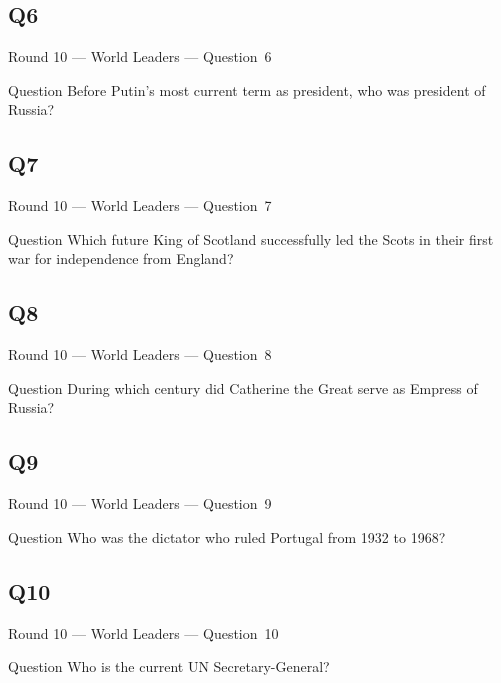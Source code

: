 \documentclass[11pt]{beamer}
\begin{document}
\subsection*{Q6}
\begin{frame}[t]{Round 10 --- World Leaders --- \mbox{Question 6}}
\vspace{-0.5em}
\begin{block}{Question}
Before Putin's most current term as president, who was president of Russia?
\end{block}
\end{frame}
\subsection*{Q7}
\begin{frame}[t]{Round 10 --- World Leaders --- \mbox{Question 7}}
\vspace{-0.5em}
\begin{block}{Question}
Which future King of Scotland successfully led the Scots in their first war for independence from England?
\end{block}
\end{frame}
\subsection*{Q8}
\begin{frame}[t]{Round 10 --- World Leaders --- \mbox{Question 8}}
\vspace{-0.5em}
\begin{block}{Question}
During which century did Catherine the Great serve as Empress of Russia?
\end{block}
\end{frame}
\subsection*{Q9}
\begin{frame}[t]{Round 10 --- World Leaders --- \mbox{Question 9}}
\vspace{-0.5em}
\begin{block}{Question}
Who was the dictator who ruled Portugal from 1932 to 1968?
\end{block}
\end{frame}
\subsection*{Q10}
\begin{frame}[t]{Round 10 --- World Leaders --- \mbox{Question 10}}
\vspace{-0.5em}
\begin{block}{Question}
Who is the current UN Secretary-General?
\end{block}
\end{frame}
\end{document}
